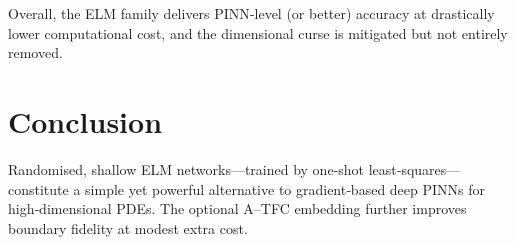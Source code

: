 \documentclass{article}
\begin{document}
Overall, the ELM family delivers PINN‑level (or better) accuracy at drastically lower computational cost, and the dimensional curse is mitigated but not entirely removed.

\section{Conclusion}
Randomised, shallow ELM networks—trained by one‐shot least‑squares—constitute a simple yet powerful alternative to gradient‑based deep PINNs for high‑dimensional PDEs.  The optional A--TFC embedding further improves boundary fidelity at modest extra cost.
\end{document}
